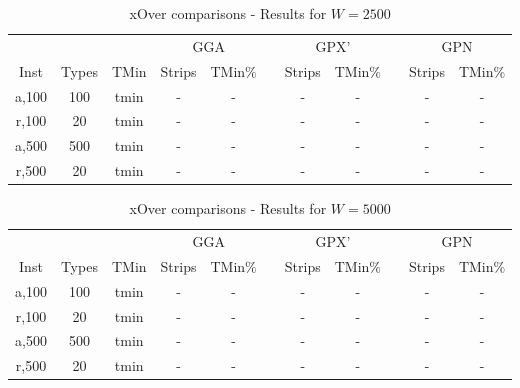 \documentclass{elsarticle}
\begin{document}
\begin{table}[h!]
	\centering
	\caption{xOver comparisons - Results for $W=2500$}
	\begin{tabular}{ccccccccccc}\toprule
		& & &\multicolumn{2}{c}{GGA} &\phantom{a}& \multicolumn{2}{c}{GPX'} &\phantom{a}& \multicolumn{2}{c}{GPN}\\
		\cmidrule{4-5} \cmidrule{7-8} \cmidrule{10-11}
		Inst & Types &TMin & Strips & TMin$\%$ && Strips & TMin$\%$ && Strips & TMin$\%$ \\ \midrule	
		a,100 & 100 & tmin & - & - && - & - && - & -\\
		r,100 & 20 & tmin & - & - && - & - && - & -\\
		\midrule
		a,500 & 500 & tmin & - & - && - & - && - & -\\
		r,500 & 20 & tmin & - & - && - & - && - & -\\
		\bottomrule
	\end{tabular}	
	\label{table:EA2500}
\end{table}

\begin{table}[h!]
	\centering
	\caption{xOver comparisons - Results for $W=5000$}
	\begin{tabular}{ccccccccccc}\toprule
		& & &\multicolumn{2}{c}{GGA} &\phantom{a}& \multicolumn{2}{c}{GPX'} &\phantom{a}& \multicolumn{2}{c}{GPN}\\
		\cmidrule{4-5} \cmidrule{7-8} \cmidrule{10-11}
		Inst & Types &TMin & Strips & TMin$\%$ && Strips & TMin$\%$ && Strips & TMin$\%$ \\ \midrule	
		a,100 & 100 & tmin & - & - && - & - && - & -\\
		r,100 & 20 & tmin & - & - && - & - && - & -\\
		\midrule
		a,500 & 500 & tmin & - & - && - & - && - & -\\
		r,500 & 20 & tmin & - & - && - & - && - & -\\
		\bottomrule
	\end{tabular}	
	\label{table:EA5000}
\end{table}
\end{document}

